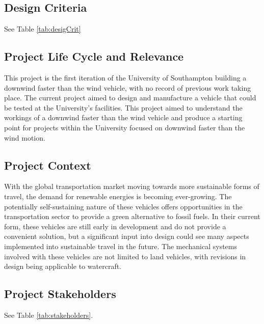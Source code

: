 \subsection{Design Criteria}

See Table \ref{tab:desigCrit}

%


\subsection{Project Life Cycle and Relevance}

This project is the first iteration of the University of Southampton building a downwind faster than the wind vehicle, with no record of previous work taking place. The current project aimed to design and manufacture a vehicle that could be tested at the University's facilities. This project aimed to understand the workings of a downwind faster than the wind vehicle and produce a starting point for projects within the University focused on downwind faster than the wind motion.



\subsection{Project Context}

With the global transportation market moving towards more sustainable forms of travel, the demand for renewable energies is becoming ever-growing. The potentially self-sustaining nature of these vehicles offers opportunities in the transportation sector to provide a green alternative to fossil fuels. In their current form, these vehicles are still early in development and do not provide a convenient solution, but a significant input into design could see many aspects implemented into sustainable travel in the future. The mechanical systems involved with these vehicles are not limited to land vehicles, with revisions in design being applicable to watercraft.

\subsection{Project Stakeholders}

See Table \ref{tab:stakeholders}.





